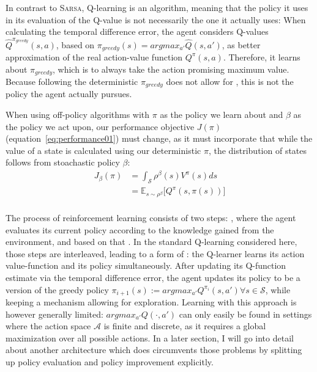 In contrast to \textsc{Sarsa}, Q-learning is an  algorithm, meaning that the policy it uses in its evaluation of the Q-value is not necessarily the one it actually uses: When calculating the temporal difference error, the agent considers Q-values $\hat{Q}^{\pi_{greedy}}(s,a)$, based on $\pi_{greedy}(s) = argmax_{a'}\hat{Q}(s,a')$, as better approximation of the real action-value function $Q^\pi(s,a)$. Therefore, it learns about $\pi_{greedy}$, which is to always take the action promising maximum value. Because following the deterministic $\pi_{greedy}$ does not allow for  , this is not the policy the agent actually pursues. 

When using off-policy algorithms with $\pi$ as the policy we learn about and $\beta$ as the policy we act upon, our performance objective $J(\pi)$ (equation~\ref{eq:performance01}) must change, as it must incorporate that while the value of a state is calculated using our deterministic $\pi$, the distribution of states follows from stoachastic policy $\beta$: 
\begin{align} 
	J_\beta(\pi) &= \int_{\mathcal{S}} \rho^\beta(s) V^\pi(s) ds \nonumber\\
	&= \mathds{E}_{s\sim\rho^\beta} \big[Q^\pi(s, \pi(s)) \big] \label{eq:performance}
\end{align}\\

The process of reinforcement learning consists of two steps: , where the agent evaluates its current policy according to the knowledge gained from the environment, and based on that . In the standard Q-learning considered here, those steps are interleaved, leading to a form of : the Q-learner learns its action value-function and its policy simultaneously. After updating its Q-function estimate via the temporal difference error, the agent updates its policy to be a  version of the greedy policy $\pi_{i+1}(s) := argmax_{a'} Q^{\pi_i}(s,a') \forall s \in \mathcal{S}$, while keeping a mechanism allowing for exploration.  Learning with this approach is however generally limited: $argmax_{a'}Q(\cdot, a')$ can only easily be found in settings where the action space $\mathcal{A}$ is finite and discrete, as it requires a global maximization over all possible actions. In a later section, I will go into detail about another architecture which does circumvents those problems by splitting up policy evaluation and policy improvement explicitly.\\


